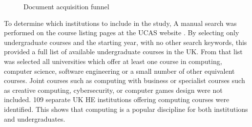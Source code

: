 \newcommand{\funnelsection}[3]{
    \path[name path=line1] (0,#1)--(10,#1);
    \path [name intersections={of = left and line1}];
    \coordinate (A)  at (intersection-1);
    \path [name intersections={of = right and line1}];
    \coordinate (B)  at (intersection-1);
    \draw [dashed] (A) -- (B) node [align=center, midway, below] {#2};%
}
\begin{figure}[ht]
\centering
{}
\caption{\label{funnel-image}Document acquisition funnel}
\end{figure}

To determine which institutions to include in the study, A manual search was performed on the course listing pages at the UCAS website \citep{UCAS2020}. By selecting only undergraduate courses and the starting year, with no other search keywords, this provided a full list of available undergraduate courses in the UK. From that list was selected all universities which offer at least one course in computing, computer science, software engineering or a small number of other equivalent courses. Joint courses such as computing with business or specialist courses such as creative computing, cybersecurity, or computer games design were not included. 109 separate UK HE institutions offering computing courses were identified. This shows that computing is a popular discipline for both institutions and undergraduates.


